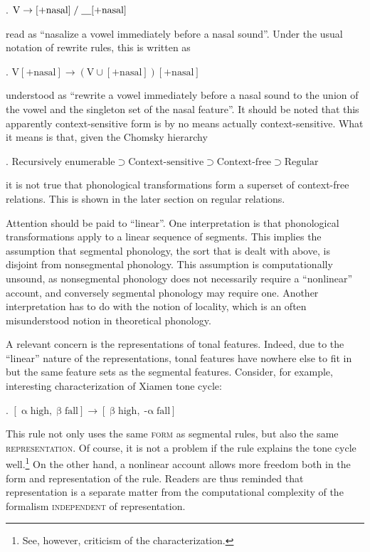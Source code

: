 \documentclass[12pt, a4paper]{report}
\newcommand{\context}{\mathrel{/}}
\newcommand{\gap}{\underline{\hspace{1em}}}
\newcommand{\textemph}[1]{\textsc{#1}}
\begin{document}
\ex. \(\text{V} \to [+\text{nasal}]
\context \text{\gap}[+\text{nasal}]\)

read as \enquote{nasalize a vowel immediately before a nasal sound}.
Under the usual notation of rewrite rules, this is written as

\ex. \(\text{V}[+\text{nasal}] \to
(\text{V} \cup [+\text{nasal}])[+\text{nasal}]\)

understood as \enquote{rewrite a vowel immediately before a nasal
  sound to the union of the vowel and the singleton set of the nasal
  feature}.  It should be noted that this apparently context-sensitive
form is by no means actually context-sensitive.  What it means is
that, given the Chomsky hierarchy \parencite{c59cfpg}

\ex. \(\text{Recursively enumerable} \supset
\text{Context-sensitive} \supset
\text{Context-free} \supset
\text{Regular}\)

it is not true that phonological transformations form a superset of
context-free relations.  This is shown in the later section on regular
relations.

Attention should be paid to \enquote{linear}.  One interpretation is
that phonological transformations apply to a linear sequence of
segments.  This implies the assumption that segmental phonology, the
sort that is dealt with above, is disjoint from nonsegmental
phonology.  This assumption is computationally unsound, as
nonsegmental phonology does not necessarily require a
\enquote{nonlinear} account, and conversely segmental phonology may
require one.  Another interpretation has to do with the notion of
locality, which is an often misunderstood notion in theoretical
phonology.

A relevant concern is the representations of tonal features.  Indeed,
due to the \enquote{linear} nature of the representations, tonal
features have nowhere else to fit in but the same feature sets as the
segmental features.  Consider, for example, 
interesting characterization of Xiamen tone cycle:

\ex. \([\mathop{\alpha}\text{high}, \mathop{\beta}\text{fall}]
\to [\mathop{\beta}\text{high}, \mathop{-\alpha}\text{fall}]\)

This rule not only uses the same \textemph{form} as segmental rules,
but also the same \textemph{representation}.  Of course, it is not a
problem if the rule explains the tone cycle well.\footnote{See,
  however,  criticism of the characterization.}  On
the other hand, a nonlinear account allows more freedom both in the
form and representation of the rule.  Readers are thus reminded that
representation is a separate matter from the computational complexity
of the formalism \textemph{independent} of representation.
\end{document}

